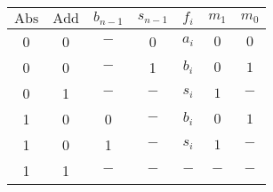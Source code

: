 \begin{tabular}{cccc|c|cc}
$\mbox{Abs}$&$\mbox{Add}$&$b_{n-1}$&$s_{n-1}$&$f_i$&$m_1$&$m_0$\\\hline
0&0&$-$&0&$a_i$&$0$&$0$\\
0&0&$-$&1&$b_i$&$0$&$1$\\
0&1&$-$&$-$&$s_i$&$1$&$-$\\
1&0&0&$-$&$b_i$&$0$&$1$\\
1&0&1&$-$&$s_i$&$1$&$-$\\
1&1&$-$&$-$&$-$&$-$&$-$
\end{tabular}